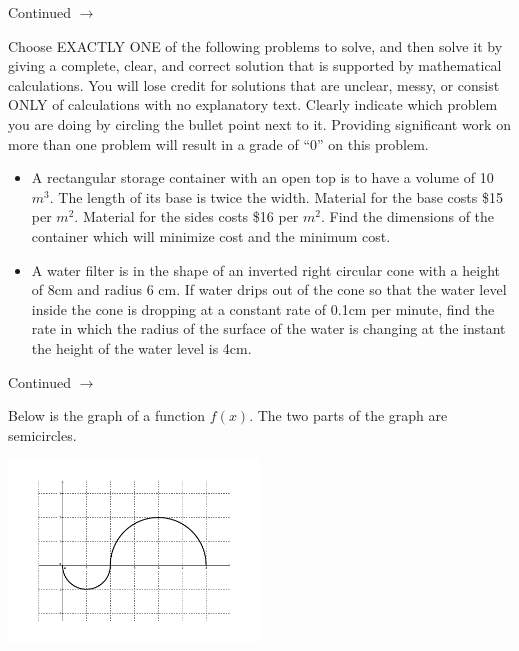 \documentclass[addpoints]{exam}
\def\pageturn{\vfill
\begin{flushright}
	\begin{small}
		Continued $\rightarrow$
	\end{small}
\end{flushright}
\newpage}
\begin{document}
\begin{questions}




\pageturn

\question[16] Choose EXACTLY ONE of the following problems to solve, and then solve it by giving a complete, clear, and correct solution that is supported by mathematical calculations. You will lose credit for solutions that are unclear, messy, or consist ONLY of calculations with no explanatory text. Clearly indicate which problem you are doing by circling the bullet point next to it. Providing significant work on more than one problem will result in a grade of ``0'' on this problem. 
	\begin{itemize}
		\item A rectangular storage container with an open top is to have a
		volume of 10 \(m^3\). The length of its base is twice the
		width. Material for the base costs \$15 per \(m^2\). Material
		for the sides costs \$16 per \(m^2\). Find the dimensions of
		the container which will minimize cost and the minimum cost.
		\item A water filter is in the shape of an inverted right circular cone with a height of 8cm and radius 6 cm. If water drips out of the cone so that the water level inside the cone is dropping at a constant rate of 0.1cm per minute, find the rate in which the radius of the surface of the water is changing at the instant the height of the water level is 4cm. 
	\end{itemize}




\pageturn

\question Below is the graph of a function $f(x)$. The two parts of the graph are semicircles. 
\begin{center}
	\includegraphics[width=0.5\textwidth]{fe-integration}
\end{center}


\end{questions}
\end{document}

